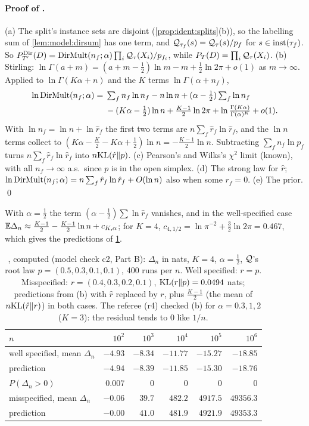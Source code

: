 \paragraph{Proof of .} (a) The split's instance sets are disjoint (\cref{prop:ident:splits}(b)), so the labelling sum of \cref{lem:model:dirsum} has one term, and $\mathcal{Q}_{\tau_f}(s)=\mathcal{Q}_\tau(s)/p_f$ for $s\in\mathrm{inst}(\tau_f)$. So $P^{\mathrm{Dir}}_{T'}(D)=\mathrm{DirMult}(n_f;\alpha)\prod_i\mathcal{Q}_\tau(X_i)/p_{f_i}$, while $P_T(D)=\prod_i\mathcal{Q}_\tau(X_i)$.
(b) Stirling: $\ln\Gamma(a+m)=(a+m-\frac12)\ln m-m+\frac12\ln2\pi+o(1)$ as $m\to\infty$. Applied to $\ln\Gamma(K\alpha+n)$ and the $K$ terms $\ln\Gamma(\alpha+n_f)$,
\begin{align*}\ln\mathrm{DirMult}(n_f;\alpha)={}&\textstyle\sum_fn_f\ln n_f-n\ln n+(\alpha-\frac12)\sum_f\ln n_f\\&\textstyle{}-(K\alpha-\frac12)\ln n+\frac{K-1}2\ln2\pi+\ln\frac{\Gamma(K\alpha)}{\Gamma(\alpha)^K}+o(1).\end{align*}
With $\ln n_f=\ln n+\ln\hat r_f$ the first two terms are $n\sum_f\hat r_f\ln\hat r_f$, and the $\ln n$ terms collect to $(K\alpha-\frac K2-K\alpha+\frac12)\ln n=-\frac{K-1}2\ln n$. Subtracting $\sum_fn_f\ln p_f$ turns $n\sum_f\hat r_f\ln\hat r_f$ into $n\mathrm{KL}(\hat r\|p)$.
(c) Pearson's and Wilks's $\chi^2$ limit (known), with all $n_f\to\infty$ a.s.\ since $p$ is in the open simplex. (d) The strong law for $\hat r$; $\ln\mathrm{DirMult}(n_f;\alpha)=n\sum_f\hat r_f\ln\hat r_f+O(\ln n)$ also when some $r_f=0$. (e) The prior. \qed

With $\alpha=\frac12$ the term $(\alpha-\frac12)\sum\ln\hat r_f$ vanishes, and in the well-specified case $\mathbb{E}\Delta_n\approx\frac{K-1}2-\frac{K-1}2\ln n+c_{K,\alpha}$; for $K=4$, $c_{4,1/2}=\ln\pi^{-2}+\frac32\ln2\pi=0.467$, which gives the predictions of \cref{tab:ident:c2}.

\begin{table}[ht]
\centering\small
\begin{tabular}{@{}lrrrrr@{}}
\toprule
$n$ & $10^2$ & $10^3$ & $10^4$ & $10^5$ & $10^6$\\
\midrule
well specified, mean $\Delta_n$ & $-4.93$ & $-8.34$ & $-11.77$ & $-15.27$ & $-18.85$\\
\quad prediction & $-4.94$ & $-8.39$ & $-11.85$ & $-15.30$ & $-18.76$\\
\quad $P(\Delta_n>0)$ & $0.007$ & $0$ & $0$ & $0$ & $0$\\
misspecified, mean $\Delta_n$ & $-0.06$ & $39.7$ & $482.2$ & $4917.5$ & $49356.3$\\
\quad prediction & $-0.00$ & $41.0$ & $481.9$ & $4921.9$ & $49353.3$\\
\bottomrule
\end{tabular}
\caption{, computed (model check c2, Part B): $\Delta_n$ in nats, $K=4$, $\alpha=\frac12$, $\mathcal{Q}$'s root law $p=(0.5,0.3,0.1,0.1)$, 400 runs per $n$. Well specified: $r=p$. Misspecified: $r=(0.4,0.3,0.2,0.1)$, $\mathrm{KL}(r\|p)=0.0494$ nats; predictions from (b) with $\hat r$ replaced by $r$, plus $\frac{K-1}2$ (the mean of $n\mathrm{KL}(\hat r\|r)$) in both cases. The referee (r4) checked (b) for $\alpha=0.3,1,2$ ($K=3$): the residual tends to $0$ like $1/n$.}
\label{tab:ident:c2}
\end{table}

